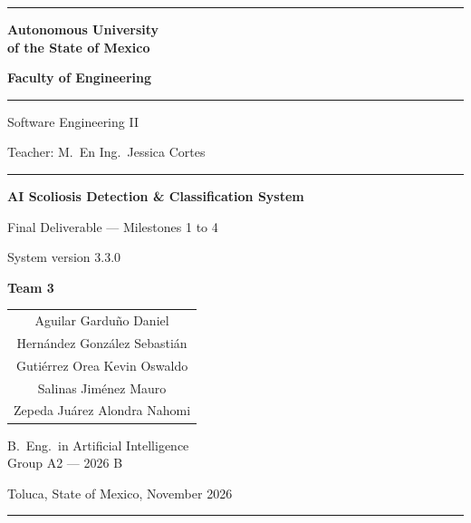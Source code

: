 \documentclass[12pt,a4paper]{article}
\begin{document}
\begin{titlepage}
    \centering
    \vspace*{0.5cm}

    \textcolor{verdeUAEM}{\rule{\linewidth}{2pt}}
    \vspace{0.3cm}
    {\Huge\bfseries\color{verdeUAEM} Autonomous University \\[0.2cm]
     of the State of Mexico \par}
    \vspace{0.3cm}
    {\Large\bfseries\color{oroUAEM} Faculty of Engineering \par}

    \vspace{1cm}
    \textcolor{oroUAEM}{\rule{0.6\linewidth}{1pt}}
    \vspace{0.5cm}

    {\Large Software Engineering II \par}
    {\large Teacher: M.\ En Ing.\ Jessica Cortes \par}

    \vspace{0.8cm}
    \textcolor{verdeUAEM}{\rule{0.4\linewidth}{0.5pt}}
    \vspace{0.5cm}

    {\huge\bfseries\color{verdeUAEM} AI Scoliosis Detection \& Classification System \par}
    \vspace{0.3cm}
    {\Large Final Deliverable --- Milestones 1 to 4 \par}
    \vspace{0.2cm}
    {\large System version 3.3.0 \par}

    \vspace{1.3cm}
    {\large\bfseries\color{oroUAEM} Team 3 \par}
    \vspace{0.3cm}
    \begin{tabular}{c}
        Aguilar Gardu\~{n}o Daniel \\
        Hern\'{a}ndez Gonz\'{a}lez Sebasti\'{a}n \\
        Guti\'{e}rrez Orea Kevin Oswaldo \\
        Salinas Jim\'{e}nez Mauro \\
        Zepeda Ju\'{a}rez Alondra Nahomi
    \end{tabular}

    \vspace{1cm}
    {\large B.\ Eng.\ in Artificial Intelligence \\ Group A2 --- 2026 B \par}
    \vspace{0.5cm}
    {\large Toluca, State of Mexico, November 2026 \par}

    \vfill
    \textcolor{oroUAEM}{\rule{\linewidth}{1pt}}
\end{titlepage}
\end{document}
